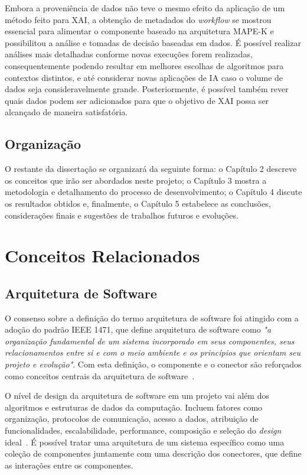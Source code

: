 \documentclass[portugues]{ic-tese}
\begin{document}
Embora a proveniência de dados não teve o mesmo efeito da aplicação de um método feito para XAI, a obtenção de metadados do \textit{workflow} se mostrou essencial para alimentar o componente baseado na arquitetura MAPE-K e possibilitou a análise e tomadas de decisão baseadas em dados. É possível realizar análises mais detalhadas conforme novas execuções forem realizadas, consequentemente podendo resultar em melhores escolhas de algoritmos para contextos distintos, e até considerar novas aplicações de IA caso o volume de dados seja consideravelmente grande. Posteriormente, é possível também rever quais dados podem ser adicionados para que o objetivo de XAI possa ser alcançado de maneira satisfatória.

\section{Organização}

O restante da dissertação se organizará da seguinte forma: o Capítulo 2 descreve os conceitos que irão ser abordados neste projeto; o Capítulo 3 mostra a metodologia e detalhamento do processo de desenvolvimento; o Capítulo 4 discute os resultados obtidos e, finalmente, o Capítulo 5 estabelece as conclusões, considerações finais e sugestões de trabalhos futuros e evoluções.

\chapter{Conceitos Relacionados}

\section{Arquitetura de Software}

O consenso sobre a definição do termo arquitetura de software foi atingido com a adoção do padrão IEEE 1471, que define arquitetura de software como \textit{"a organização fundamental de um sistema incorporado em seus componentes, seus relacionamentos entre si e com o meio ambiente e os princípios que orientam seu projeto e evolução"}. Com esta definição, o componente e o conector são reforçados como conceitos centrais da arquitetura de software~\citep{Bosch_2004}.

O nível de design da arquitetura de software em um projeto vai além dos algoritmos e estruturas de dados da computação. Incluem fatores como organização, protocolos de comunicação, acesso a dados, atribuição de funcionalidades, escalabilidade, performance, composição e seleção do \textit{design} ideal~\citep{Garlan_1993}. É possível tratar uma arquitetura de um sistema específico como uma coleção de componentes juntamente com uma descrição dos conectores, que define as interações entre os componentes.
\end{document}
